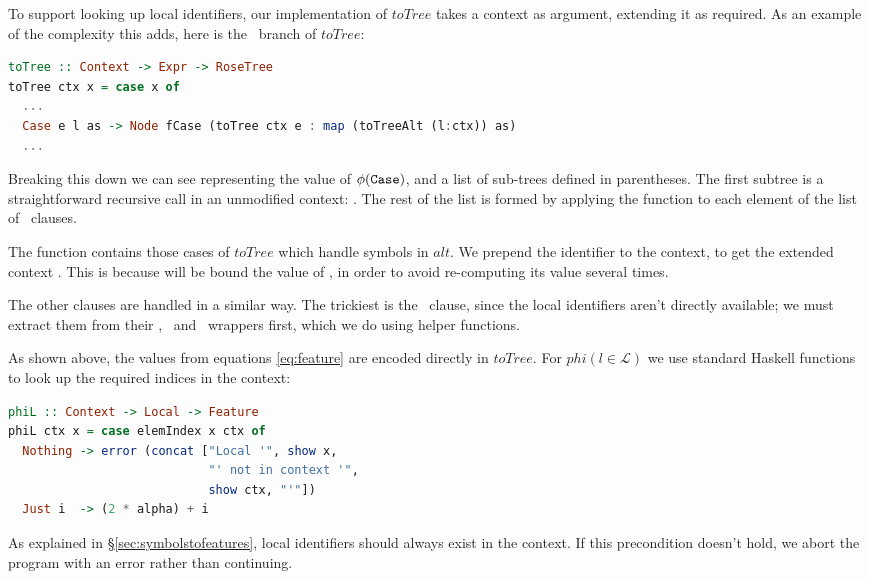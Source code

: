 To support looking up local identifiers, our implementation of $toTree$ takes a context as argument, extending it as required. As an example of the complexity this adds, here is the \CCase\ branch of $toTree$:

\begin{lstlisting}[language=Haskell, xleftmargin=0pt, xrightmargin=0pt]
toTree :: Context -> Expr -> RoseTree
toTree ctx x = case x of
  ...
  Case e l as -> Node fCase (toTree ctx e : map (toTreeAlt (l:ctx)) as)
  ...
\end{lstlisting}

Breaking this down we can see  representing the value of $\phi(\texttt{Case})$, and a list of sub-trees defined in parentheses. The first subtree is a straightforward recursive call in an unmodified context: \mbox{}. The rest of the list is formed by applying the function \mbox{} to each element of the list  of \CAlt\ clauses.

The  function contains those cases of $toTree$ which handle symbols in $alt$. We prepend the identifier  to the context, to get the extended context . This is because  will be bound the value of , in order to avoid re-computing its value several times.

The other clauses are handled in a similar way. The trickiest is the \CLet\ clause, since the local identifiers aren't directly available; we must extract them from their \CRec, \CNonRec\ and \CBind\ wrappers first, which we do using helper functions.

As shown above, the values from equations \ref{eq:feature} are encoded directly in $toTree$. For $phi(l \in \mathcal{L})$ we use standard Haskell functions to look up the required indices in the context:

\begin{lstlisting}[language=Haskell, xleftmargin=0.1\textwidth, xrightmargin=0.1\textwidth]
phiL :: Context -> Local -> Feature
phiL ctx x = case elemIndex x ctx of
  Nothing -> error (concat ["Local '", show x,
                            "' not in context '",
                            show ctx, "'"])
  Just i  -> (2 * alpha) + i
\end{lstlisting}

As explained in \S \ref{sec:symbolstofeatures}, local identifiers should always exist in the context. If this precondition doesn't hold, we abort the program with an error rather than continuing.

